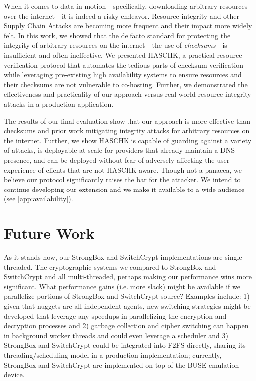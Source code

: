 When it comes to data in motion---specifically, downloading arbitrary resources
over the internet---it is indeed a risky endeavor. Resource integrity and other
Supply Chain Attacks are becoming more frequent and their impact more widely
felt. In this work, we showed that the de facto standard for protecting the
integrity of arbitrary resources on the internet---the use of
\emph{checksums}---is insufficient and often ineffective. We presented HASCHK, a
practical resource verification protocol that automates the tedious parts of
checksum verification while leveraging pre-existing high availability systems to
ensure resources and their checksums are not vulnerable to co-hosting. Further,
we demonstrated the effectiveness and practicality of our approach versus
real-world resource integrity attacks in a production application.

The results of our final evaluation show that our approach is more effective
than checksums and prior work mitigating integrity attacks for arbitrary
resources on the internet. Further, we show HASCHK is capable of guarding
against a variety of attacks, is deployable at scale for providers that already
maintain a DNS presence, and can be deployed without fear of adversely affecting
the user experience of clients that are not HASCHK-aware. Though not a panacea,
we believe our protocol significantly raises the bar for the attacker. We intend
to continue developing our extension and we make it available to a wide audience
(see \cref{app:availability}).

\section{Future Work}

As it stands now, our StrongBox and SwitchCrypt implementations are single
threaded. The cryptographic systems we compared to StrongBox and SwitchCrypt and
all multi-threaded, perhaps making our performance wins more significant. What
performance gains (i.e. more slack) might be available if we parallelize
portions of StrongBox and SwitchCrypt source? Examples include: 1) given that
nuggets are all independent agents, new switching strategies might be developed
that leverage any speedups in parallelizing the encryption and decryption
processes and 2) garbage collection and cipher switching can happen in
background worker threads and could even leverage a scheduler and 3) StrongBox
and SwitchCrypt could be integrated into F2FS directly, sharing its
threading/scheduling model in a production implementation; currently, StrongBox
and SwitchCrypt are implemented on top of the BUSE emulation device.

